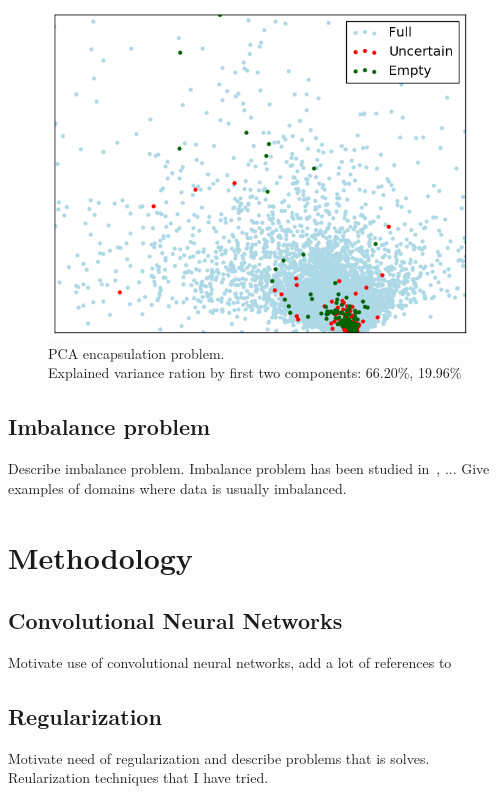 \documentclass[a4paper, 11pt, table]{article}
\begin{document}
\begin{figure}[H]
\centering
\includegraphics[scale=0.7]{pca/encapsulation.png}
\caption{PCA encapsulation problem. \\ Explained variance ration by first two components: 66.20\%, 19.96\%}
\end{figure}

\subsection{Imbalance problem}

Describe imbalance problem. Imbalance problem has been studied in~\cite{imbalanced-data}, ...
Give examples of domains where data is usually imbalanced. 

\section{Methodology}

\subsection{Convolutional Neural Networks}
Motivate use of convolutional neural networks, add a lot of references to~\cite{dl_book}
\subsection{Regularization}

Motivate need of regularization and describe problems that is solves. 
Reularization techniques that I have tried.
\end{document}

